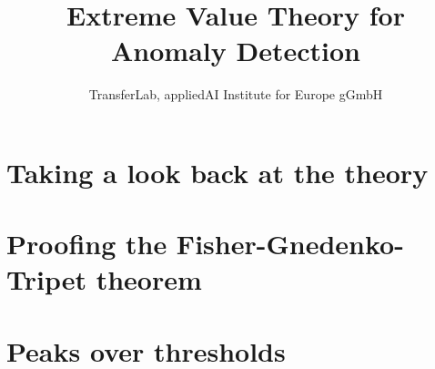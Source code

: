 

\title{Extreme Value Theory for Anomaly Detection}
\author{TransferLab, appliedAI Institute for Europe gGmbH} 



\maketitle 


\section{Taking a look back at the theory}

\newpage


\section{Proofing the Fisher-Gnedenko-Tripet theorem}

\newpage

\section{Peaks over thresholds}

\newpage



